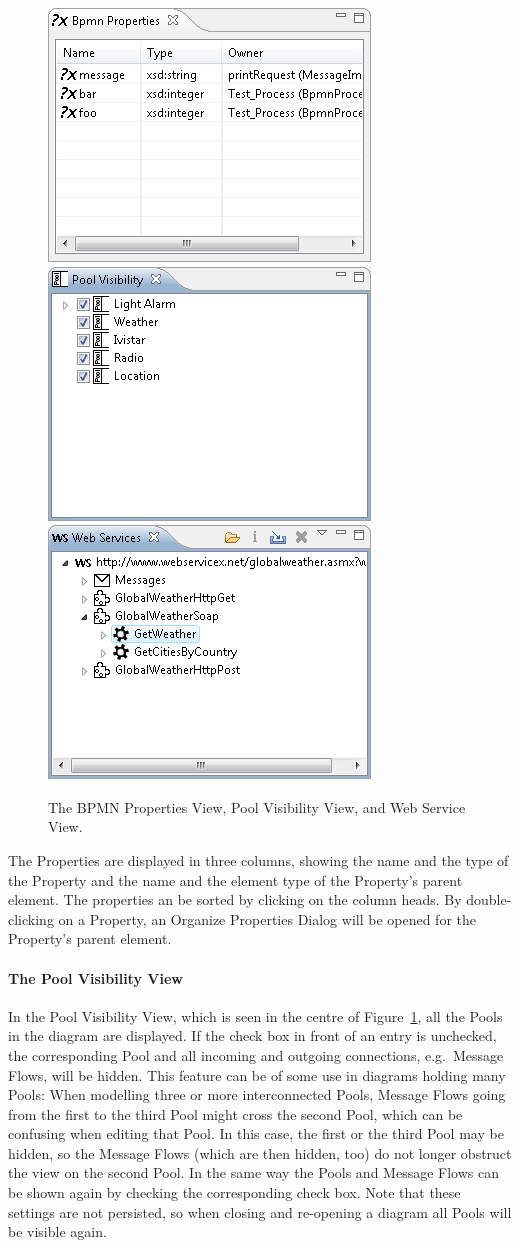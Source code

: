 \begin{figure}[t]
	\centering
	\includegraphics[width=.3\textwidth]{figures/features/propView.png}
	\hspace{.5cm}
	\includegraphics[width=.3\textwidth]{figures/features/poolView.png}
	\hspace{.5cm}
	\includegraphics[width=.3\textwidth]{figures/features/wsView.png}
	\caption{The BPMN Properties View, Pool Visibility View, and Web Service View.}
	\label{fig:customViews}
\end{figure}

The Properties are displayed in three columns, showing the name and the type of
the Property and the name and the element type of the Property's parent element.
The properties an be sorted by clicking on the column heads.  By double-clicking
on a Property, an Organize Properties Dialog will be opened for the Property's
parent element.

\paragraph*{The Pool Visibility View}

In the Pool Visibility View, which is seen in the centre of Figure~\ref{fig:customViews},
all the Pools in the diagram are displayed.  If the check box in front of an entry
is unchecked, the corresponding Pool and all incoming and outgoing connections,
e.g.\ Message Flows, will be hidden.  This feature can be of some use in diagrams
holding many Pools: When modelling three or more interconnected Pools, Message
Flows going from the first to the third Pool might cross the second Pool, which
can be confusing when editing that Pool.  In this case, the first or the third
Pool may be hidden, so the Message Flows (which are then hidden, too) do not
longer obstruct the view on the second Pool.  In the same way the Pools and
Message Flows can be shown again by checking the corresponding check box.  Note
that these settings are not persisted, so when closing and re-opening a diagram
all Pools will be visible again.


